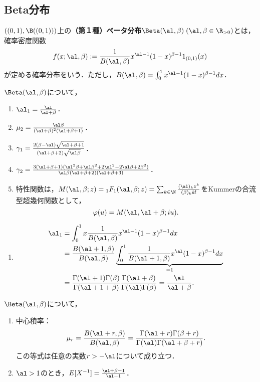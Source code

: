 \documentclass[uplatex,dvipdfmx]{jsreport}
\begin{document}
\subsection{Beta分布}

\begin{definition}
    $((0,1),\B((0,1)))$上の\textbf{（第１種）ベータ分布}$\Beta(\al,\beta)\;(\al,\beta\in\R_{>0})$とは，
    確率密度関数
    \[f(x;\al,\beta):=\frac{1}{B(\al,\beta)}x^{\al-1}(1-x)^{\beta-1}1_{(0,1)}(x)\]
    が定める確率分布をいう．ただし，$B(\al,\beta)=\int^1_0x^{\al-1}(1-x)^{\beta-1}dx$．
\end{definition}

\begin{proposition}[Beta分布の特性値]
    $\Beta(\al,\beta)$について，
    \begin{enumerate}
        \item $\al_1=\frac{\al}{\al+\beta}$．
        \item $\mu_2=\frac{\al\beta}{(\al+\beta)^2(\al+\beta+1)}$．
        \item $\gamma_1=\frac{2(\beta-\al)\sqrt{\al+\beta+1}}{(\al+\beta+2)\sqrt{\al\beta}}$．
        \item $\gamma_2=\frac{3(\al+\beta+1)(\al^2\beta+\al\beta^2+2\al^2-2\al\beta+2\beta^2)}{\al\beta(\al+\beta+2)(\al+\beta+3)}$．
        \item 特性関数は，$M(\al,\beta;z)={}_1F_1(\al,\beta;z)=\sum_{k\in\N}\frac{(\al)_kz^k}{(\beta)_kk!}$をKummerの合流型超幾何関数として，
        \[\varphi(u)=M(\al,\al+\beta;iu).\]
    \end{enumerate}
\end{proposition}
\begin{Proof}\mbox{}
    \begin{enumerate}
        \item \begin{align*}
            \al_1&=\int^1_0x\frac{1}{B(\al,\beta)}x^{\al-1}(1-x)^{\beta-1}dx\\
            &=\frac{B(\al+1,\beta)}{B(\al,\beta)}\underbrace{\int^1_0\frac{1}{B(\al+1,\beta)}x^\al(1-x)^{\beta-1}dx}_{=1}\\
            &=\frac{\Gamma(\al+1)\Gamma(\beta)}{\Gamma(\al+1+\beta)}\frac{\Gamma(\al+\beta)}{\Gamma(\al)\Gamma(\beta)}=\frac{\al}{\al+\beta}.
        \end{align*}
    \end{enumerate}
\end{Proof}

\begin{proposition}[積率]
    $\Beta(\al,\beta)$について，
    \begin{enumerate}
        \item 中心積率：
        \[\mu_r=\frac{B(\al+r,\beta)}{B(\al,\beta)}=\frac{\Gamma(\al+r)\Gamma(\beta+r)}{\Gamma(\al)\Gamma(\al+\beta+r)}.\]
        この等式は任意の実数$r>-\al$について成り立つ．
        \item $\al>1$のとき，$E[X^{-1}]=\frac{\al+\beta-1}{\al-1}$．
    \end{enumerate}
\end{proposition}
\end{document}
